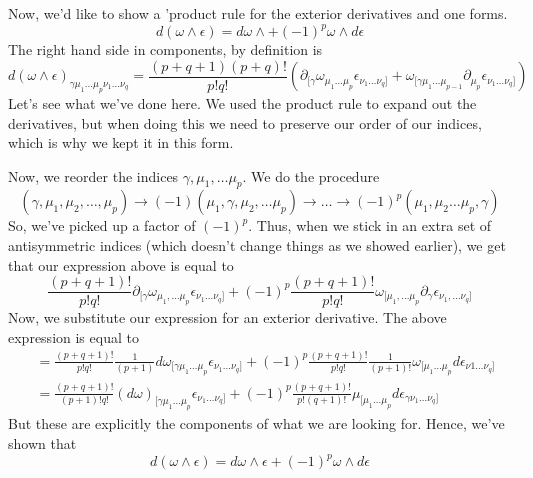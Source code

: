 Now, we'd like to show a 'product rule for the exterior  
derivatives and one forms. 
\[
d (\omega  \wedge  \epsilon )  = d\omega  \wedge  + ( -1) ^{ p } \omega  \wedge  d \epsilon  
\] The right hand side in components, 
by definition is 
\[
	d (  \omega  \wedge  \epsilon)_{\gamma \mu_1 \dots \mu_{p } \nu_1 \dots \nu_{ q } } = \frac{ ( p + q + 1 ) ( p + q ) ! 	 }{ p ! q ! } \left( \partial_{ [ \gamma } \omega _{ \mu_1 \dots \mu_{ p } } \epsilon_{ \nu_1 \dots \nu_{ q } ] }  + \omega _{ [ \gamma \mu_1 \dots \mu_{ p - 1 } } \partial_{ \mu_{ p  }  } \epsilon_{ \nu_1 \dots \nu_{ q   } ]  } \right)   
\] Let's see what we've done here. 
We used the product rule to expand out the derivatives, 
but when doing this we need to preserve our order of 
our indices, which is why we kept it in this form. 

Now, we reorder the indices $ \gamma, \mu_1 , \dots \mu_{ p} $. 
We do the procedure 
\[
( \gamma, \mu_1, \mu_2 , \dots , \mu_{p } ) \to ( -1 ) ( \mu_1 , \gamma , \mu_2 , \dots \mu_{ p } ) \to \dots \to ( -1)^{ p } ( \mu_1 , \mu_2 \dots \mu_{ p }, \gamma ) 
\] 
So, we've picked up a factor of $ ( - 1)^{ p }$. 
Thus, when we stick in an extra set of antisymmetric 
indices (which doesn't change things as we showed earlier), 
we get that our expression above is equal to  
\[
\frac{ ( p + q + 1 )! }{ p ! q !  } \partial_{ [ \gamma  } \omega  _{ \mu_1 , \dots \mu_{ p }   } \epsilon_{ \nu_1 \dots \nu_{ q } ] } + ( -1)^{ p } \frac{ ( p + q + 1 )! }{ p ! q !  } \omega _{ [ \mu_1 , \dots \mu_{ p } } \partial_{  \gamma  } \epsilon_{ \nu_{1 }, \dots \nu_{q } ]} 
\] Now, we substitute our expression for an 
exterior derivative. 
The above expression is equal to 
\begin{align*}
 & = \frac{ ( p + q + 1 )! }{ p ! q ! } \frac{1}{ ( p + 1 ) } d\omega _{  [ \gamma \mu_1 \dots \mu_{ p } } \epsilon_{ \nu_1 \dots \nu_{ q } ] } +  ( - 1) ^{ p }\frac{ ( p + q + 1 ) !}{ p ! q ! } \frac{1}{ ( p + 1 ) ! } \omega _{ [ \mu_1 \dots \mu _{ p } } d \epsilon_{ \nu 1 \dots \nu _{ q } ]    } \\
 &= \frac{ ( p + q + 1 )! }{ ( p  + 1 ) ! q ! } ( d \omega)_{ [ \gamma \mu_1 \dots \mu_{ p } } \epsilon_{ \nu_1 \dots \nu_{ q  } ]  }  +  ( - 1)^ p \frac{ ( p + q + 1 ) ! }{ p ! ( q + 1 ) ! } \mu_{ [ \mu_1 \dots \mu _{ p }  } d \epsilon_{ \gamma \nu_1 \dots \nu_{ q } ] }
\end{align*} 
But these are explicitly the components of what we 
are looking for. Hence, we've shown that 
\[
d ( \omega  \wedge  \epsilon )  = d \omega \wedge  \epsilon + ( - 1)^ p  \omega  \wedge  d \epsilon 
\] 
